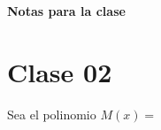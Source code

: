 \documentclass[12pt]{article}
\begin{document}
    \begin{center}
        \textbf{\Large Notas para la clase}
    \end{center}

    \section{Clase 02}
    {
        Sea el polinomio $M(x) = $
    }\label{sec:clase-02}
\end{document}
